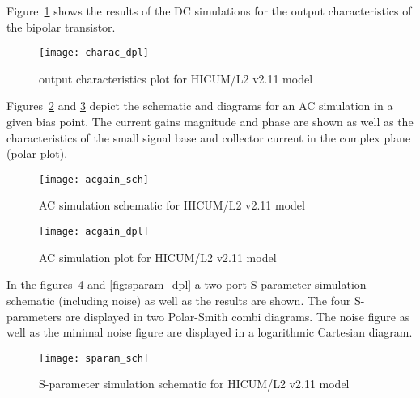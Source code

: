 Figure~\ref{fig:charac_dpl} shows the results of the DC simulations
for the output characteristics of the bipolar transistor.

\begin{figure}[ht]
\begin{center}
\texttt{[image: charac\_dpl]}
\end{center}
\caption{output characteristics plot for HICUM/L2 v2.11 model}
\label{fig:charac_dpl}
\end{figure}
\FloatBarrier


Figures~\ref{fig:acgain_sch} and \ref{fig:acgain_dpl} depict the
schematic and diagrams for an AC simulation in a given bias point.
The current gains magnitude and phase are shown as well as the
characteristics of the small signal base and collector current in the
complex plane (polar plot).

\begin{figure}[ht]
\begin{center}
\texttt{[image: acgain\_sch]}
\end{center}
\caption{AC simulation schematic for HICUM/L2 v2.11 model}
\label{fig:acgain_sch}
\end{figure}
\FloatBarrier

\begin{figure}[ht]
\begin{center}
\texttt{[image: acgain\_dpl]}
\end{center}
\caption{AC simulation plot for HICUM/L2 v2.11 model}
\label{fig:acgain_dpl}
\end{figure}
\FloatBarrier


In the figures~\ref{fig:sparam_sch} and \ref{fig:sparam_dpl} a
two-port S-parameter simulation schematic (including noise) as well as
the results are shown.  The four S-parameters are displayed in two
Polar-Smith combi diagrams.  The noise figure as well as the minimal
noise figure are displayed in a logarithmic Cartesian diagram.

\begin{figure}[ht]
\begin{center}
\texttt{[image: sparam\_sch]}
\end{center}
\caption{S-parameter simulation schematic for HICUM/L2 v2.11 model}
\label{fig:sparam_sch}
\end{figure}
\FloatBarrier

